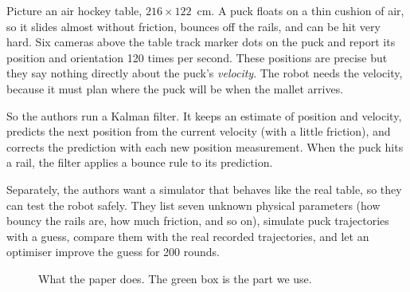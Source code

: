 \documentclass[11pt,a4paper]{article}
\newcommand{\rr}{\bm{r}}
\begin{document}
Picture an air hockey table, $216\times122$~cm. A puck floats on a thin cushion of air, so it
slides almost without friction, bounces off the rails, and can be hit very hard. Six cameras above
the table track marker dots on the puck and report its position and orientation 120 times per
second. These positions are precise but they say nothing directly about the puck's \emph{velocity}.
The robot needs the velocity, because it must plan where the puck will be when the mallet arrives.

So the authors run a Kalman filter. It keeps an estimate of position and velocity, predicts the
next position from the current velocity (with a little friction), and corrects the prediction with
each new position measurement. When the puck hits a rail, the filter applies a bounce rule to its
prediction.

Separately, the authors want a simulator that behaves like the real table, so they can test the
robot safely. They list seven unknown physical parameters (how bouncy the rails are, how much
friction, and so on), simulate puck trajectories with a guess, compare them with the real recorded
trajectories, and let an optimiser improve the guess for 200 rounds.

\begin{figure}[H]
\centering
{}
\caption{What the paper does. The green box is the part we use.}
\end{figure}
\end{document}
